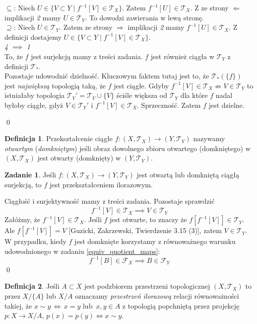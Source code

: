 \documentclass{article}
\theoremstyle{definition}%
\newtheorem{defn}{Definicja}
\theoremstyle{theorem}
\newtheorem{zad}{Zadanie}
\renewenvironment{proof}{{\bfseries Rozwiązanie \\}}{\qed}
\newcommand{\sT}{\mathcal{T}} %
\newcommand{\sF}{\mathcal{F}} %
\begin{document}
\begin{proof}
\[	\]
	$\subseteq$: Niech $U \in \{V \subset Y \mid f^{-1}[V] \in \sT_X \}$. Zatem $f^{-1}[U] \in \sT_X$. Z ze strony $\Leftarrow$ implikacji \emph{2} mamy $U \in \sT_Y$. To dowodzi zawierania w lewą stronę. \\
	$\supseteq$: Niech $U \in \sT_Y$. Zatem ze strony $\Rightarrow$ implikacji \emph{2} mamy $f^{-1}[U] \in \sT_X$. Z definicji dostajemy $U \in \{V \subset Y \mid f^{-1}[V] \in \sT_X \}$.
	\\
	\emph{4} $\implies$ \emph{1}
	\\
	To, że $f$ jest surjekcją mamy z treści zadania. $f$ jest również ciągła w $\sT_Y$ z definicji $\sT_*$.\\
	Pozostaje udowodnić dzielność. Kluczowym faktem tutaj jest to, że $\sT_*(\{f\})$ jest \emph{największą} topologią taką, że $f$ jest ciągłe. Gdyby $f^{-1}[V] \in \sT_X \not\Rightarrow V \in \sT_Y$ to istniałaby topologia $\sT_Y' = \sT_Y \cup \{V\}$ ściśle większa od $\sT_Y$ dla które $f$ nadal byłoby ciągłe, gdyż $V\in \sT_Y'$ i $f^{-1}[V] \in \sT_X$. Sprzeczność. Zatem $f$ jest dzielne.
	
	\end{proof} 
	\begin{defn}
		Przekształcenie ciągłe $f:(X,\sT_X) \to (Y,\sT_Y)$ nazywamy \emph{otwartym} (\emph{domkniętym}) jeśli obraz dowolnego zbioru otwartego (domkniętego) w $(X,\sT_X)$ jest otwarty (domknięty) w $(Y,\sT_Y)$.
	\end{defn}
	\begin{zad}
		Jeśli $f: (X,\sT_X) \to (Y,\sT_Y)$ jest otwartą lub domkniętą ciągłą surjekcją, to $f$ jest przekształceniem ilorazowym. 
	\end{zad}
	\begin{proof}
		Ciągłość i surjektywność mamy z treści zadania. Pozostaje sprawdzić
		\[
		f^{-1}[V]\in \sT_X \implies V \in \sT_Y
		\]
		Załóżmy, że $f^{-1}[V] \in \sT_X$. Jeśli $f$ jest otwarte, to znaczy że $f[f^{-1}[V]] \in \sT_Y$. Ale $f[f^{-1}[V]] = V$ [Guzicki, Zakrzewski, Twierdzenie 3.15 (3)], zatem $V\in \sT_Y$.
		\\
		W przypadku, kiedy $f$ jest domknięte korzystamy z równoważnego warunku udowodnionego w zadaniu \ref{equiv_quotient_maps}:
		\[
		f^{-1}[B]\in \sF_X \implies B \in \sF_Y
		\]
	\end{proof}
	\begin{defn}
		 Jeśli $A\subset X$ jest podzbiorem przestrzeni topologicznej $(X,\sT_X)$ to przez $X/\{A\}$  lub $X/A$ oznaczamy \emph{przestrzeń ilorazową} relacji równoważności takiej, że $x \sim y\, \iff \, x=y$ {lub}\, $x,y\in A$ z topologią popchniętą przez projekcję $p: X \to X/A$, $p(x)=p(y) \Leftrightarrow x \sim y$.
	\end{defn}
\end{document}

